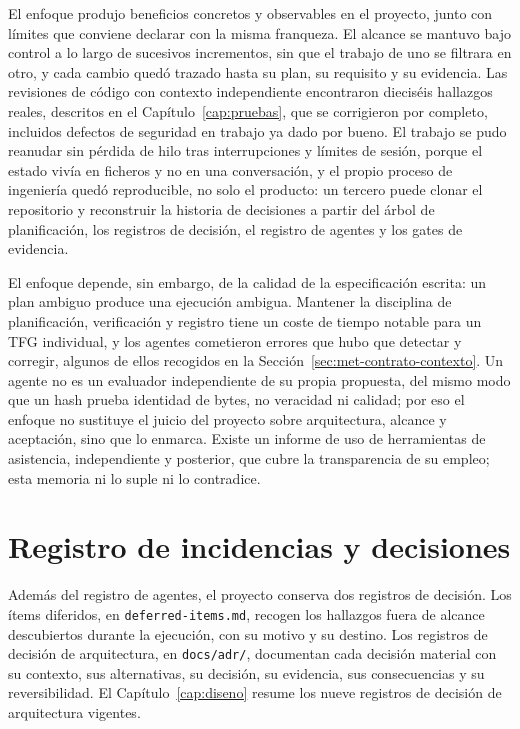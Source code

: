 El enfoque produjo beneficios concretos y observables en el proyecto, junto con límites que
conviene declarar con la misma franqueza. El alcance se mantuvo bajo control a lo largo de
sucesivos incrementos, sin que el trabajo de uno se filtrara en otro, y cada cambio quedó
trazado hasta su plan, su requisito y su evidencia. Las revisiones de código con contexto
independiente encontraron dieciséis hallazgos reales, descritos en el
Capítulo~\ref{cap:pruebas}, que se corrigieron por completo, incluidos defectos de seguridad en
trabajo ya dado por bueno. El trabajo se pudo reanudar sin pérdida de hilo tras interrupciones
y límites de sesión, porque el estado vivía en ficheros y no en una conversación, y el propio
proceso de ingeniería quedó reproducible, no solo el producto: un tercero puede clonar el
repositorio y reconstruir la historia de decisiones a partir del árbol de planificación, los
registros de decisión, el registro de agentes y los gates de evidencia.

El enfoque depende, sin embargo, de la calidad de la especificación escrita: un plan ambiguo
produce una ejecución ambigua. Mantener la disciplina de planificación, verificación y registro
tiene un coste de tiempo notable para un TFG individual, y los agentes cometieron errores que
hubo que detectar y corregir, algunos de ellos recogidos en la
Sección~\ref{sec:met-contrato-contexto}. Un agente no es un evaluador independiente de su
propia propuesta, del mismo modo que un hash prueba identidad de bytes, no veracidad ni calidad;
por eso el enfoque no sustituye el juicio del proyecto sobre arquitectura, alcance y aceptación,
sino que lo enmarca. Existe un informe de uso de herramientas de asistencia, independiente y
posterior, que cubre la transparencia de su empleo; esta memoria ni lo suple ni lo contradice.

\section{Registro de incidencias y decisiones}\label{sec:met-incidencias}

Además del registro de agentes, el proyecto conserva dos registros de decisión. Los ítems
diferidos, en \texttt{deferred-items.md}, recogen los hallazgos fuera de alcance descubiertos
durante la ejecución, con su motivo y su destino. Los registros de decisión de arquitectura,
en \texttt{docs/adr/}, documentan cada decisión material con su contexto, sus alternativas,
su decisión, su evidencia, sus consecuencias y su reversibilidad. El
Capítulo~\ref{cap:diseno} resume los nueve registros de decisión de arquitectura vigentes.

